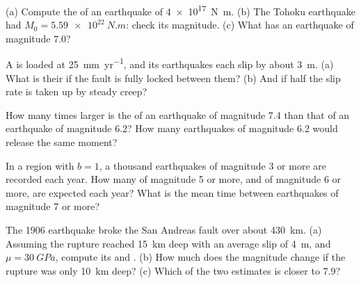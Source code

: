 \begin{exercise}[$\star$]\label{exo:b1:earthquake-source:1}
(a) Compute the  of an earthquake of 
\qty{4e17}{N.m}. (b) The Tohoku earthquake had $M_0 = \qty{5.59e22}{N.m}$:
check its magnitude. (c) What  has an earthquake of magnitude
7.0?
\end{exercise}

\begin{exercise}[$\star$]\label{exo:b1:earthquake-source:2}
A  is loaded at \qty{25}{mm.yr^{-1}}, and its earthquakes
each slip by about \qty{3}{m}. (a) What is their  if the
fault is fully locked between them? (b) And if half the slip rate is taken up
by steady creep?
\end{exercise}

\begin{exercise}[$\star$]\label{exo:b1:earthquake-source:3}
How many times larger is the  of an earthquake of magnitude 7.4
than that of an earthquake of magnitude 6.2? How many earthquakes of magnitude
6.2 would release the same moment?
\end{exercise}

\begin{exercise}[$\star$]\label{exo:b1:earthquake-source:4}
In a region with $b = 1$, a thousand earthquakes of magnitude 3 or more are
recorded each year. How many of magnitude 5 or more, and of magnitude 6 or
more, are expected each year? What is the mean time between earthquakes of
magnitude 7 or more?
\end{exercise}

\begin{exercise}[$\star\star$]\label{exo:b1:earthquake-source:5}
The 1906 earthquake broke the San Andreas fault over about \qty{430}{km}.
(a) Assuming the rupture reached \qty{15}{km} deep with an average slip of
\qty{4}{m}, and $\mu = \qty{30}{GPa}$, compute its  and . (b) How much does the magnitude change if the rupture was only
\qty{10}{km} deep? (c) Which of the two estimates is closer to 7.9?
\end{exercise}

